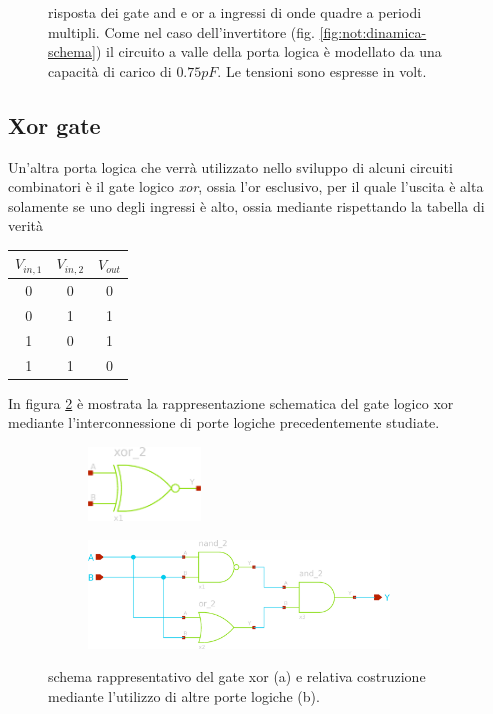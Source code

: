 	\begin{figure}[bht]
		\centering
		
		\caption{risposta dei gate and e or a ingressi di onde quadre a periodi multipli. Come nel caso dell'invertitore (fig. \ref{fig:not:dinamica-schema}) il circuito a valle della porta logica è modellato da una capacità di carico di $0.75pF$. Le tensioni sono espresse in volt.}
		\label{fig:andor:dinamica}
	\end{figure}

\subsection*{Xor gate}
	Un'altra porta logica che verrà utilizzato nello sviluppo di alcuni circuiti combinatori è il gate logico \textit{xor}, ossia l'or esclusivo, per il quale l'uscita è alta solamente se uno degli ingressi è alto, ossia mediante rispettando la tabella di verità
	\begin{center}
		\begin{tabular}{c c | c}
			$V_{in,1}$ & $V_{in,2}$ & $V_{out}$ \\ \hline
			0 & 0 & 0 \\
			0 & 1 & 1 \\
			1 & 0 & 1 \\
			1 & 1 & 0 \\
		\end{tabular}
	\end{center}
	
	In figura \ref{fig:xor} è mostrata la rappresentazione schematica del gate logico xor mediante l'interconnessione di porte logiche precedentemente studiate.
	
	\begin{figure}[bht]
		\centering
		\begin{subfigure}{0.48\linewidth}
			\centering
			\includegraphics[width=3cm]{Immagini/xor-gate-simple}
			\caption{}
		\end{subfigure}
		\begin{subfigure}{0.48\linewidth}
			\centering
			\includegraphics[width=8cm]{Immagini/xor-gate}
			\caption{}
		\end{subfigure}
		\caption{schema rappresentativo del gate xor (a) e relativa costruzione mediante l'utilizzo di altre porte logiche (b).}
		\label{fig:xor}
	\end{figure}

